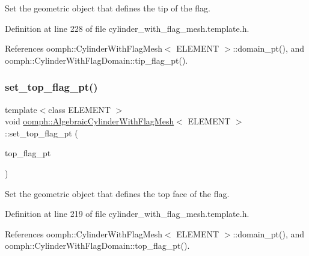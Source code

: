 Set the geometric object that defines the tip of the flag. 



Definition at line 228 of file cylinder\+\_\+with\+\_\+flag\+\_\+mesh.\+template.\+h.



References oomph\+::\+Cylinder\+With\+Flag\+Mesh$<$ E\+L\+E\+M\+E\+N\+T $>$\+::domain\+\_\+pt(), and oomph\+::\+Cylinder\+With\+Flag\+Domain\+::tip\+\_\+flag\+\_\+pt().

\mbox{\label{classoomph_1_1AlgebraicCylinderWithFlagMesh_a9d7f04acdaed3e9f2133d9665dd4b799}} 
\subsubsection{\texorpdfstring{set\+\_\+top\+\_\+flag\+\_\+pt()}{set\_top\_flag\_pt()}}
{\footnotesize\ttfamily template$<$class E\+L\+E\+M\+E\+NT $>$ \\
void \hyperlink{classoomph_1_1AlgebraicCylinderWithFlagMesh}{oomph\+::\+Algebraic\+Cylinder\+With\+Flag\+Mesh}$<$ E\+L\+E\+M\+E\+NT $>$\+::set\+\_\+top\+\_\+flag\+\_\+pt (\begin{DoxyParamCaption}\item[{\hyperlink{classoomph_1_1GeomObject}{Geom\+Object} $\ast$}]{top\+\_\+flag\+\_\+pt }\end{DoxyParamCaption})\hspace{0.3cm}{\ttfamily [inline]}}



Set the geometric object that defines the top face of the flag. 



Definition at line 219 of file cylinder\+\_\+with\+\_\+flag\+\_\+mesh.\+template.\+h.



References oomph\+::\+Cylinder\+With\+Flag\+Mesh$<$ E\+L\+E\+M\+E\+N\+T $>$\+::domain\+\_\+pt(), and oomph\+::\+Cylinder\+With\+Flag\+Domain\+::top\+\_\+flag\+\_\+pt().

\mbox{\label{classoomph_1_1AlgebraicCylinderWithFlagMesh_ad6af2e420e0f152a7fb055f25400a5d0}} 
